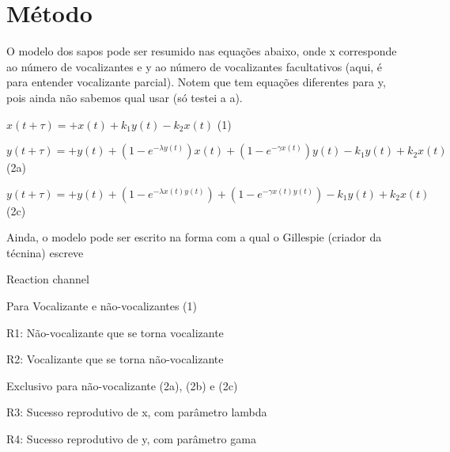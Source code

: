 \section{Método}\label{Metodo}

O modelo dos sapos pode ser resumido nas equações abaixo, onde x corresponde ao número de vocalizantes e y ao número de vocalizantes facultativos (aqui, é para entender vocalizante parcial). Notem que tem  equações diferentes para y, pois ainda não sabemos qual usar (só testei a a).

\begin{center}
\vspace{3 mm}
$x(t + \tau)= +x(t) +k_1 y(t) -k_2 x(t)$ (1)

\vspace{3 mm}
$y(t + \tau)= +y(t) + (1-e^{-\lambda y(t)})x(t) + (1-e^{-\gamma x(t)})y(t) -k_1 y(t) +k_2 x(t)$ (2a)

\vspace{3 mm}
$y(t + \tau)= +y(t) + (1-e^{-\lambda x(t)y(t)}) + (1-e^{-\gamma x(t)y(t)}) -k_1 y(t) +k_2 x(t)$ (2c)
\end{center}

Ainda, o modelo pode ser escrito na forma com a qual o Gillespie (criador da técnina) escreve

Reaction channel

Para Vocalizante e não-vocalizantes (1)

R1: Não-vocalizante que se torna vocalizante

R2: Vocalizante que se torna não-vocalizante

Exclusivo para não-vocalizante (2a), (2b) e (2c)

R3: Sucesso reprodutivo de x, com parâmetro lambda

R4: Sucesso reprodutivo de y, com parâmetro gama
